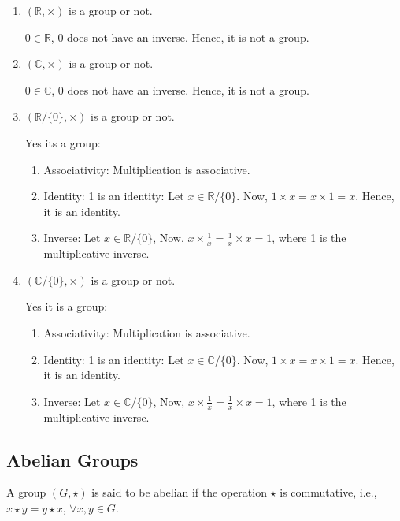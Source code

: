 \documentclass[12pt, oneside]{book}
\begin{document}
\begin{enumerate}
    \item \( \left(\mathbb{R}, \times \right)\) is a group or not.
    
    \(0 \in \mathbb{R}\), \(0\) does not have an inverse. Hence, it is not a group.

    \item \(\left(\mathbb{C}, \times\right)\) is a group or not.
    
    \(0 \in \mathbb{C}\), \(0\) does not have an inverse. Hence, it is not a group.
    
    \item \(\left(\mathbb{R}/\{0\}, \times \right)\) is a group or not.
    
    Yes its a group:
    \begin{enumerate}
        \item Associativity: Multiplication is associative.
        \item Identity: 1 is an identity:
        Let \(x \in \mathbb{R}/\{0\} \). Now, \(1 \times x = x \times 1 = x\). Hence, it is an identity.
        \item Inverse: Let \(x \in \mathbb{R}/\{0\} \), Now, \(x \times \frac{1}{x} = \frac{1}{x} \times x = 1\), where 1 is the multiplicative inverse.
    \end{enumerate}

    \item \(\left(\mathbb{C}/\{0\}, \times \right)\) is a group or not.
    
    Yes it is a group:
    \begin{enumerate}
        \item Associativity: Multiplication is associative.
        \item Identity: 1 is an identity:
        Let \(x \in \mathbb{C}/\{0\} \). Now, \(1 \times x = x \times 1 = x\). Hence, it is an identity.
        \item Inverse: Let \(x \in \mathbb{C}/\{0\} \), Now, \(x \times \frac{1}{x} = \frac{1}{x} \times x = 1\), where 1 is the multiplicative inverse.
    \end{enumerate}
\end{enumerate}
\subsection{Abelian Groups}
A group \( \left(G, \star \right) \) is said to be abelian if the operation \(\star\) is commutative, i.e., \(x \star y = y \star x\), \(\forall x,y \in G\).
\end{document}
